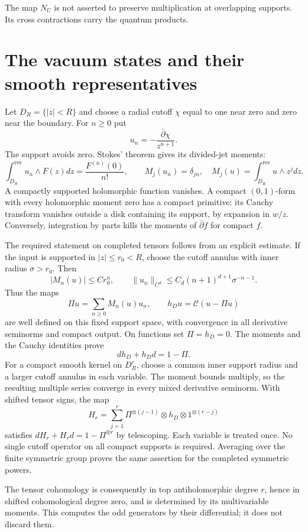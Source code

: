 The map $N_U$ is not asserted to preserve multiplication at overlapping
supports.  Its cross contractions carry the quantum products.

\section{The vacuum states and their smooth representatives}

Let $D_R=\{|z|<R\}$ and choose a radial cutoff $\chi$ equal to one
near zero and zero near the boundary.  For $n\ge0$ put
\[
 u_n=-\frac{\bar\partial\chi}{z^{n+1}}.
\]
The support avoids zero.  Stokes' theorem gives its divided-jet moments:
\[
 \int_{D_R}^{\mathrm{res}}u_n\wedge F(z)dz
       =\frac{F^{(n)}(0)}{n!},\qquad
 M_j(u_n)=\delta_{jn},\quad
 M_j(u)=\int_{D_R}^{\mathrm{res}}u\wedge z^jdz.
\]
A compactly supported holomorphic function vanishes.  A compact
$(0,1)$-form with every holomorphic moment zero has a compact primitive:
its Cauchy transform vanishes outside a disk containing its support,
by expansion in $w/z$.  Conversely, integration by parts kills the
moments of $\bar\partial f$ for compact $f$.

The required statement on completed tensors follows from an explicit
estimate.  If the input is supported in $|z|\le r_0<R$, choose the
cutoff annulus with inner radius $\sigma>r_0$.  Then
\[
 |M_n(u)|\le C r_0^n,\qquad
 \|u_n\|_{C^d}\le C_d(n+1)^{d+1}\sigma^{-n-1}.
\]
Thus the maps
\[
 \Pi u=\sum_{n\ge0}M_n(u)u_n,\qquad
 h_Du=\mathscr C(u-\Pi u)
\]
are well defined on this fixed support space, with convergence in
all derivative seminorms and compact output.  On functions set
$\Pi=h_D=0$.  The moments and the Cauchy identities prove
\[
 dh_D+h_Dd=1-\Pi.
\]
For a compact smooth kernel on $D_R^r$, choose a common inner support
radius and a larger cutoff annulus in each variable.  The moment
bounds multiply, so the resulting multiple series converge in every
mixed derivative seminorm.  With shifted tensor signs, the map
\[
 H_r=\sum_{j=1}^r
       \Pi^{\otimes(j-1)}\otimes h_D\otimes1^{\otimes(r-j)}
\]
satisfies $dH_r+H_rd=1-\Pi^{\otimes r}$ by telescoping.
Each variable is treated once.  No single cutoff operator on all
compact supports is required.  Averaging over the finite symmetric
group proves the same assertion for the completed symmetric powers.

The tensor cohomology is consequently in top antiholomorphic degree
$r$, hence in shifted cohomological degree zero, and is determined
by its multivariable moments.  This computes the odd generators by
their differential; it does not discard them.


